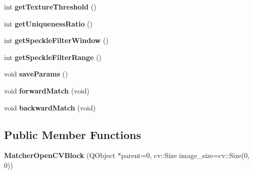 \begin{DoxyCompactItemize}
\item 
\hypertarget{class_matcher_open_c_v_block_aab48ecee03a3c961d47ebc087b45a820}{}int {\bfseries get\+Texture\+Threshold} ()\label{class_matcher_open_c_v_block_aab48ecee03a3c961d47ebc087b45a820}

\item 
\hypertarget{class_matcher_open_c_v_block_a9c9ed77a220f19e79b35ac6b0e6d1fc4}{}int {\bfseries get\+Uniqueness\+Ratio} ()\label{class_matcher_open_c_v_block_a9c9ed77a220f19e79b35ac6b0e6d1fc4}

\item 
\hypertarget{class_matcher_open_c_v_block_a9190ab77f353a5fb3bde1ead371802b0}{}int {\bfseries get\+Speckle\+Filter\+Window} ()\label{class_matcher_open_c_v_block_a9190ab77f353a5fb3bde1ead371802b0}

\item 
\hypertarget{class_matcher_open_c_v_block_a69f73917c0acafd723fdafb6a915c14c}{}int {\bfseries get\+Speckle\+Filter\+Range} ()\label{class_matcher_open_c_v_block_a69f73917c0acafd723fdafb6a915c14c}

\item 
\hypertarget{class_matcher_open_c_v_block_ae5ec6be50177c4540668ee1508c84de0}{}void {\bfseries save\+Params} ()\label{class_matcher_open_c_v_block_ae5ec6be50177c4540668ee1508c84de0}

\item 
\hypertarget{class_matcher_open_c_v_block_a2abcf69b70bed18c59609b1a432a3fbd}{}void {\bfseries forward\+Match} (void)\label{class_matcher_open_c_v_block_a2abcf69b70bed18c59609b1a432a3fbd}

\item 
\hypertarget{class_matcher_open_c_v_block_a7c31fc9dbe970b3cf7e01a0f1c5baf60}{}void {\bfseries backward\+Match} (void)\label{class_matcher_open_c_v_block_a7c31fc9dbe970b3cf7e01a0f1c5baf60}

\end{DoxyCompactItemize}
\subsection*{Public Member Functions}
\begin{DoxyCompactItemize}
\item 
\hypertarget{class_matcher_open_c_v_block_a8299a5da1c1a66530dab107e7cda885f}{}{\bfseries Matcher\+Open\+C\+V\+Block} (Q\+Object $\ast$parent=0, cv\+::\+Size image\+\_\+size=cv\+::\+Size(0, 0))\label{class_matcher_open_c_v_block_a8299a5da1c1a66530dab107e7cda885f}

\end{DoxyCompactItemize}
